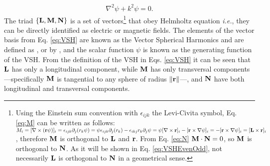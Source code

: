 \begin{align}
	\nabla^2 \psi + k^2 \psi = 0.
\label{eq:HelmoltzScalar}
\end{align}
%
The triad $\left\{\vb{L},\vb{M},\vb{N}\right\}$ is a set of vectors\footnote{%
		Using the Einstein sum convention with $\epsilon_{ijk}$ the Levi-Civita symbol, Eq. \eqref{eq:M} can be written as follows: %
	 		$M_i = [\nabla\times(\vb{r}\psi)]_i
	 		=  \epsilon_{ijk}\partial_j(r_k\psi)
	 		=\psi\epsilon_{ijk}\partial_j(r_k) -\epsilon_{ikj}r_k\partial_j\psi
	 		=\psi[\nabla\times\vb{r}]_i - [\vb{r}\times\nabla\psi]_i
	 		= - [\vb{r}\times\nabla\psi]_i
	 		= [\vb{L}\times\vb{r}]_i$,%
	 	therefore $\vb{M}$ is orthogonal to $\vb{L}$ and $\vb{r}$. From Eq. \eqref{eq:N} $\vb{M}\cdot\vb{N}=0$, so $\vb{M}$ is orthogonal to $\vb{N}$. As it will be shown in Eq. \eqref{eq:VSHEvenOdd}, not necessarily $\vb{L}$ is orthogonal to $\vb{N}$ in a geometrical sense.
	}%
 that obey Helmholtz equation \textit{i.e.}, they can be directly identified as electric or magnetic fields. The elements of the vector basis from Eq. \eqref{eq:VSH}   are known as the Vector Spherical Harmonics and are defined as  \citeauthor{stratton_electromagnetic_2012} \cite{stratton_electromagnetic_2012}, or by \citeauthor{bohren_absorption_1983} \cite{bohren_absorption_1983}, and the scalar function $\psi$ is known as the generating function of the VSH. From the definition of the VSH in Eqs. \eqref{eq:VSH} it can be seen that $\vb{L}$ has only a longitudinal component, while $\vb{M}$ has only transversal components ---specifically $\vb{M}$ is tangential to any sphere of radius $\norm{\vb{r}}$---, and $\vb{N}$ have both longitudinal and transversal components.

